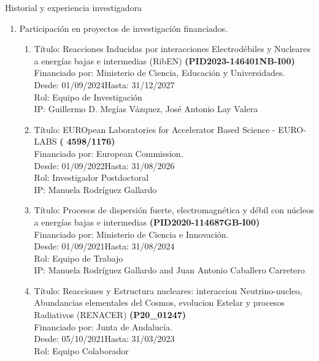 \documentclass{resume2} %
\begin{document}
\begin{rSection}{Historial y experiencia investigadora}
\begin{enumerate}[label=\alph*.]
\begin{enumerate}[label=\arabic*.]
\end{enumerate}

\item Participaci\'on en proyectos de investigaci\'on financiados.

\begin{enumerate}[label=\arabic*.]

\item {\sc T\'itulo}: Reacciones Inducidas por interacciones Electrodébiles y Nucleares a energías bajas
e intermedias (RibEN) {\bf (PID2023-146401NB-I00)}\\
{\sc Financiado por}: Ministerio de Ciencia, Educaci\'on y Universidades.\\
{\sc Desde}: 01/09/2024\hfill {\sc Hasta}: 31/12/2027\\
{\sc Rol}: Equipo de Investigación\\
{\sc IP}: Guillermo D. Meg\'ias V\'azquez, Jos\'e Antonio Lay Valera\\
\item {\sc T\'itulo}: EUROpean Laboratories for Accelerator Based Science - EURO-LABS
{\bf( 4598/1176)}\\
{\sc Financiado por}: European Commission.\\
{\sc Desde}: 01/09/2022\hfill {\sc Hasta}: 31/08/2026\\
{\sc Rol}: Investigador Postdoctoral\\
{\sc IP}: Manuela Rodr\'iguez Gallardo\\
\item {\sc T\'itulo}: Procesos de dispersión fuerte, electromagnética y débil con núcleos a energías bajas e intermedias
{\bf(PID2020-114687GB-I00)}\\
{\sc Financiado por}: Ministerio de Ciencia e Innovación.\\
{\sc Desde}: 01/09/2021\hfill {\sc Hasta}: 31/08/2024\\
{\sc Rol}: Equipo de Trabajo\\
{\sc IP}: Manuela Rodr\'iguez Gallardo and Juan Antonio Caballero Carretero\\
\item {\sc T\'itulo}: Reacciones y Estructura nucleares: interaccion Neutrino-nucleo, Abundancias elementales del Cosmos, evolucion Estelar y procesos Radiativos (RENACER)
{\bf(P20\_01247)}\\
{\sc Financiado por}: Junta de Andaluc\'ia.\\
{\sc Desde}: 05/10/2021\hfill {\sc Hasta}: 31/03/2023\\
{\sc Rol}: Equipo Colaborador\\

\end{enumerate}
\end{enumerate}
\end{rSection}
\end{document}
